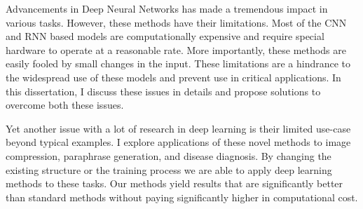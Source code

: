 Advancements in Deep Neural Networks has made a tremendous impact in various tasks. 
However, these methods have their limitations. 
Most of the CNN and RNN based models are computationally expensive and require special hardware to operate at a reasonable rate.
More importantly, these methods are easily fooled by small changes in the input. 
These limitations are a hindrance to the widespread use of these models and prevent use in critical applications.
In this dissertation, I discuss these issues in details and propose solutions to overcome both these issues.

Yet another issue with a lot of research in deep learning is their limited use-case beyond typical examples.
I explore applications of these novel methods to image compression, paraphrase generation, and disease diagnosis.
By changing the existing structure or the training process we are able to apply deep learning methods to these tasks.
Our methods yield results that are significantly better than standard methods without paying significantly higher in computational cost.
